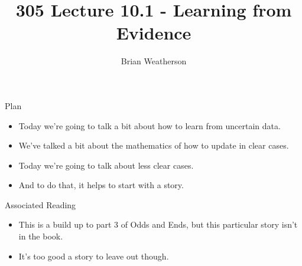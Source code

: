 \documentclass[
  ignorenonframetext,
]{beamer}
\title{305 Lecture 10.1 - Learning from Evidence}
\author{Brian Weatherson}
\date{}
\providecommand{\tightlist}{%
  \setlength{\itemsep}{0pt}\setlength{\parskip}{0pt}}
\renewcommand{\,}{\text{, }}
\begin{document}
\frame{\titlepage}

\begin{frame}{Plan}
\protect\hypertarget{plan}{}
\begin{itemize}
\tightlist
\item
  Today we're going to talk a bit about how to learn from uncertain
  data.
\item
  We've talked a bit about the mathematics of how to update in clear
  cases.
\item
  Today we're going to talk about less clear cases.
\item
  And to do that, it helps to start with a story.
\end{itemize}
\end{frame}

\begin{frame}{Associated Reading}
\protect\hypertarget{associated-reading}{}
\begin{itemize}
\tightlist
\item
  This is a build up to part 3 of Odds and Ends, but this particular
  story isn't in the book.
\item
  It's too good a story to leave out though.
\end{itemize}
\end{frame}
\end{document}
